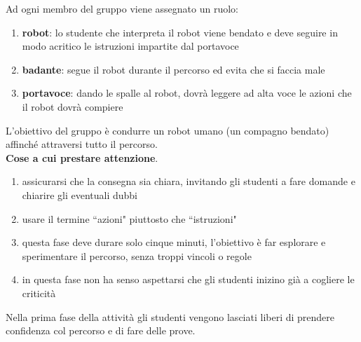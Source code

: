 \documentclass[12pt]{article}
\begin{document}
Ad ogni membro del gruppo viene assegnato un ruolo:

\begin{enumerate}
\item \textbf{robot}: lo studente che interpreta il robot viene bendato e deve seguire in modo acritico le istruzioni impartite dal portavoce
\item \textbf{badante}: segue il robot durante il percorso ed evita che si faccia male
\item \textbf{portavoce}: dando le spalle al robot, dovrà leggere ad alta voce le azioni che il robot dovrà compiere
\end{enumerate}

L'obiettivo del gruppo è condurre un robot umano (un compagno bendato) affinché attraversi tutto il percorso.\\


\textbf{Cose a cui prestare attenzione}.
\begin{enumerate}
\item assicurarsi che la consegna sia chiara, invitando gli studenti a fare domande e chiarire gli eventuali dubbi
\item usare il termine ``azioni" piuttosto che ``istruzioni"
\item questa fase deve durare solo cinque minuti, l'obiettivo è far esplorare e sperimentare il percorso, senza troppi vincoli o regole
\item in questa fase non ha senso aspettarsi che gli studenti inizino già a cogliere le criticità
\end{enumerate}

Nella prima fase della attività gli studenti vengono lasciati liberi di prendere confidenza col percorso e di fare delle prove.
\end{document}
